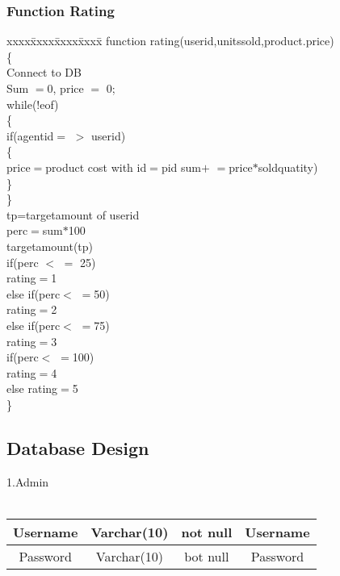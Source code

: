\documentclass[twocolumn,10pt]{article}
\begin{document}
\subsubsection{Function Rating}
\begin{tabbing}
xxxx\=xxxx\=xxxx\=xxxx\= \kill
function rating(userid,unitssold,product.price)\\
\{\>\\
\>Connect to DB\\
\>Sum $=$0, price $=$ 0;\\
\>while(!eof)\\
\>\{\\
\>\>if(agentid$=$ $>$ userid)\\
\>\>\{\\
\>\>\>price$=$product cost with id$=$pid sum$+$ $=$price$*$soldquatity)\\
\>\>\}\>\\
\>\}\>\\

\>tp=targetamount of userid\\
\>perc$=$sum$*$100\\ 
\>targetamount(tp)\\
\>if(perc $<$ $=$ 25)\\
\>\>rating$=$1\\
\>else if(perc$<$ $=$50)\\
\>\>rating$=$2\\
\>else if(perc$<$ $=$75)\\
\>\>rating$=$3\\
\>if(perc$<$ $=$100)\\
\>\>rating$=$4\\
\>else
\>\>rating$=$5\\
\}

\end{tabbing}


\subsection{Database Design}
1.Admin\\\\
\begin{tabular}{|c|c|c|c|}
\hline 
\rule[-1ex]{0pt}{2.5ex} Username & Varchar(10) & not null & Username \\ 
\hline 
\rule[-1ex]{0pt}{2.5ex} Password & Varchar(10) & bot null & Password \\ 
\hline 
\end{tabular} \\
\end{document}
